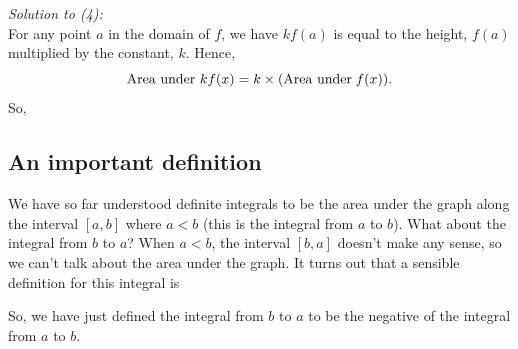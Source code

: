   	\bigskip
	
	\hfil{}
	\bigskip
	\bigskip


\noindent \textit{Solution to (4):} \\
For any point $a$ in the domain of $f$, we have $kf(a)$ is equal to the height, $f(a)$ multiplied by the constant, $k$. Hence,
\[
\text{Area under $kf(x) = k\times \left(\text{Area under}\; f(x)\right)$}.
\]
So,

  	\bigskip
	
	\hfil{}
	\bigskip
	\bigskip
	
\subsection{An important definition} \label{integral b to a}
We have so far understood definite integrals to be the area under the graph along the interval $[a,b]$ where $a < b$ (this is the integral from $a$ to $b$). What about the integral from $b$ to $a$? When $a < b$, the interval $[b,a]$ doesn't make any sense, so we can't talk about the area under the graph. It turns out that a sensible definition for this integral is

  	\bigskip
	
	\hfil{}
	\bigskip
	\bigskip
	
\noindent So, we have just defined the integral from $b$ to $a$ to be the negative of the integral from $a$ to $b$. 


